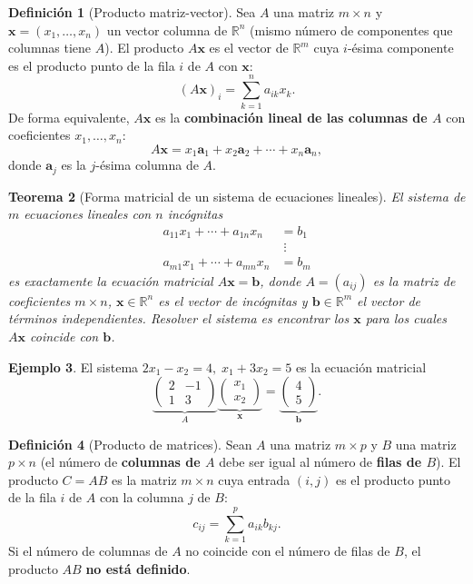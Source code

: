 \documentclass[11pt,letterpaper]{article}
\theoremstyle{definition}
\newtheorem{definicion}{Definición}[section]
\newtheorem{ejemplo}[definicion]{Ejemplo}
\theoremstyle{plain}
\newtheorem{teorema}[definicion]{Teorema}
\newcommand{\R}{\mathbb{R}}
\newcommand{\vv}[1]{\mathbf{#1}}
\begin{document}
\begin{definicion}[Producto matriz-vector]
Sea $A$ una matriz $m\times n$ y $\vv{x}=(x_1,\ldots,x_n)$ un vector columna de $\R^n$ (mismo
número de componentes que columnas tiene $A$). El producto $A\vv{x}$ es el vector de $\R^m$ cuya
$i$-ésima componente es el producto punto de la fila $i$ de $A$ con $\vv{x}$:
\[
  (A\vv{x})_i = \sum_{k=1}^n a_{ik}x_k.
\]
De forma equivalente, $A\vv{x}$ es la \textbf{combinación lineal de las columnas de $A$} con
coeficientes $x_1,\ldots,x_n$:
\[
  A\vv{x} = x_1\vv{a}_1 + x_2\vv{a}_2 + \cdots + x_n\vv{a}_n,
\]
donde $\vv{a}_j$ es la $j$-ésima columna de $A$.
\end{definicion}

\begin{teorema}[Forma matricial de un sistema de ecuaciones lineales]
El sistema de $m$ ecuaciones lineales con $n$ incógnitas
\[
\begin{aligned}
  a_{11}x_1+\cdots+a_{1n}x_n &= b_1 \\
  &\;\vdots \\
  a_{m1}x_1+\cdots+a_{mn}x_n &= b_m
\end{aligned}
\]
es exactamente la ecuación matricial $A\vv{x}=\vv{b}$, donde $A=(a_{ij})$ es la matriz de
coeficientes $m\times n$, $\vv{x}\in\R^n$ es el vector de incógnitas y $\vv{b}\in\R^m$ el vector de
términos independientes. Resolver el sistema es encontrar los $\vv{x}$ para los cuales $A\vv{x}$
coincide con $\vv{b}$.
\end{teorema}

\begin{ejemplo}
El sistema $2x_1-x_2=4,\; x_1+3x_2=5$ es la ecuación matricial
\[
  \underbrace{\begin{pmatrix}2&-1\\1&3\end{pmatrix}}_{A}
  \underbrace{\begin{pmatrix}x_1\\x_2\end{pmatrix}}_{\vv{x}} =
  \underbrace{\begin{pmatrix}4\\5\end{pmatrix}}_{\vv{b}}.
\]
\end{ejemplo}

\begin{definicion}[Producto de matrices]
Sean $A$ una matriz $m\times p$ y $B$ una matriz $p\times n$ (el número de \textbf{columnas de
$A$} debe ser igual al número de \textbf{filas de $B$}). El producto $C=AB$ es la matriz
$m\times n$ cuya entrada $(i,j)$ es el producto punto de la fila $i$ de $A$ con la columna $j$ de
$B$:
\[
  c_{ij} = \sum_{k=1}^p a_{ik}b_{kj}.
\]
Si el número de columnas de $A$ no coincide con el número de filas de $B$, el producto $AB$
\textbf{no está definido}.
\end{definicion}
\end{document}
